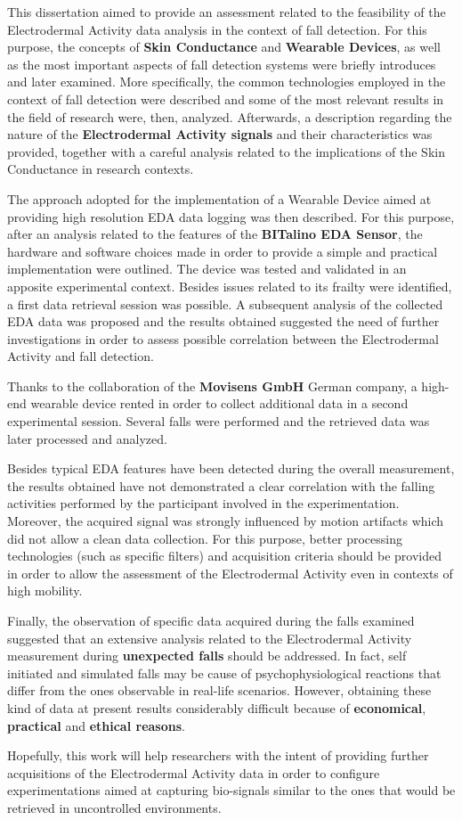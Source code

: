 \label{ch:conclusions}

This dissertation aimed to provide an assessment related to the feasibility of the Electrodermal Activity data analysis in the context of fall detection. For this purpose, the concepts of \textbf{Skin Conductance} and \textbf{Wearable Devices}, as well as the most important aspects of fall detection systems were briefly introduces and later examined. More specifically, the common technologies employed in the context of fall detection were described and some of the most relevant results in the field of research were, then, analyzed. Afterwards, a description regarding the nature of the \textbf{Electrodermal Activity signals} and their characteristics was provided, together with a careful analysis related to the implications of the Skin Conductance in research contexts.

The approach adopted for the implementation of a Wearable Device aimed at providing high resolution EDA data logging was then described. For this purpose, after an analysis related to the features of the \textbf{BITalino EDA Sensor}, the hardware and software choices made in order to provide a simple and practical implementation were outlined. The device was tested and validated in an apposite experimental context. Besides issues related to its frailty were identified, a first data retrieval session was possible. A subsequent analysis of the collected EDA data was proposed and the results obtained suggested the need of further investigations in order to assess possible correlation between the Electrodermal Activity and fall detection.

Thanks to the collaboration of the \textbf{Movisens GmbH} German company, a high-end wearable device rented in order to collect additional data in a second experimental session. Several falls were performed and the retrieved data was later processed and analyzed.

Besides typical EDA features have been detected during the overall measurement, the results obtained have not demonstrated a clear correlation with the falling activities performed by the participant involved in the experimentation. Moreover, the acquired signal was strongly influenced by motion artifacts which did not allow a clean data collection. For this purpose, better processing technologies (such as specific filters) and acquisition criteria should be provided in order to allow the assessment of the Electrodermal Activity even in contexts of high mobility.

Finally, the observation of specific data acquired during the falls examined suggested that an extensive analysis related to the Electrodermal Activity measurement during \textbf{unexpected falls} should be addressed. In fact, self initiated and simulated falls may be cause of psychophysiological reactions that differ from the ones observable in real-life scenarios. However, obtaining these kind of data at present results considerably difficult because of \textbf{economical}, \textbf{practical} and \textbf{ethical reasons}.

Hopefully, this work will help researchers with the intent of providing further acquisitions of the Electrodermal Activity data in order to configure experimentations aimed at capturing bio-signals similar to the ones that would be retrieved in uncontrolled environments.



